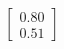 \documentclass[preview]{standalone}
\begin{document}
\begin{align*}
\begin{bmatrix} 0.80 \\ 0.51 \end{bmatrix}
\end{align*}
\end{document}
